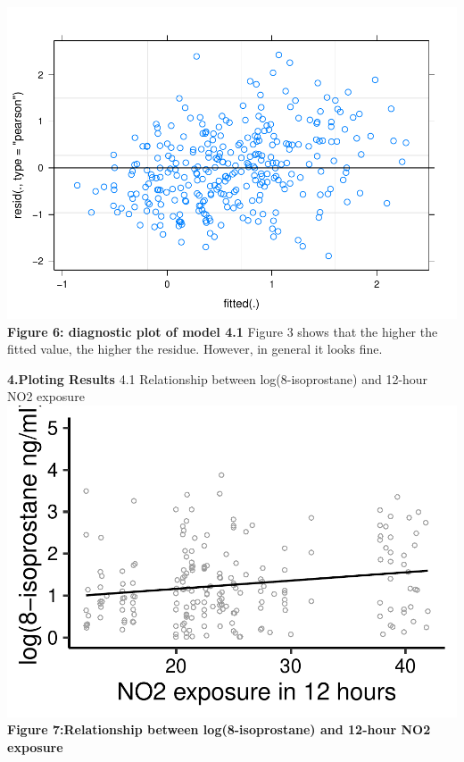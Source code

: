 \documentclass[12pt,]{article}
\begin{document}
\includegraphics{872_files/figure-latex/unnamed-chunk-7-1.pdf}
\center \textbf{Figure 6: diagnostic plot of model 4.1} \center Figure 3
shows that the higher the fitted value, the higher the residue. However,
in general it looks fine.

\textbf{4.Ploting Results} 4.1 Relationship between log(8-isoprostane)
and 12-hour NO2 exposure
\includegraphics{872_files/figure-latex/unnamed-chunk-8-1.pdf}
\center \textbf{Figure 7:Relationship between log(8-isoprostane) and
12-hour NO2 exposure } \center
\end{document}
